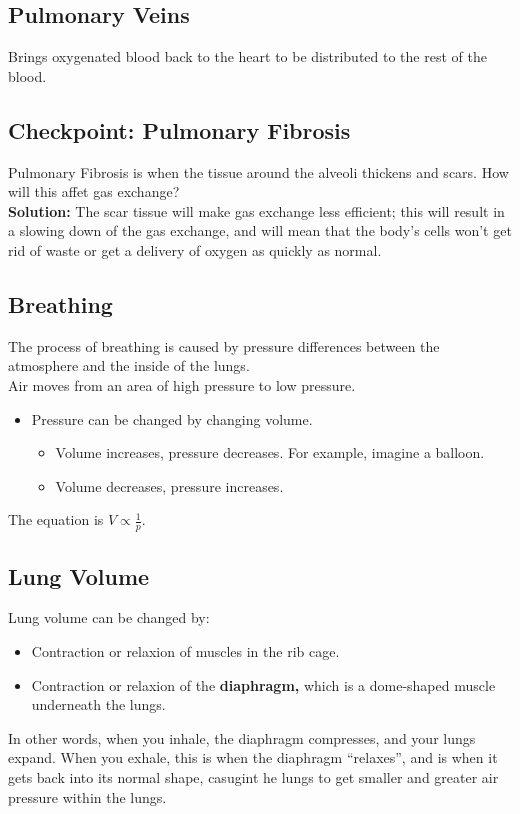 \documentclass[12pt]{report}
\begin{document}
\subsection{Pulmonary Veins}
\begin{definition}
    Brings oxygenated blood back to the heart to be distributed to the rest of the blood.
\end{definition}

\subsection{Checkpoint: Pulmonary Fibrosis}
Pulmonary Fibrosis is when the tissue around the alveoli thickens and scars. How will this affet gas exchange?\\ 

\textbf{Solution:} The scar tissue will make gas exchange less efficient; this will result in a slowing down of the gas exchange, and will mean that the body's cells won't get rid of waste or get a delivery of oxygen as quickly as normal.

\subsection{Breathing}
\begin{definition}[Breathing]
    The process of breathing is caused by pressure differences between the atmosphere and the inside of the lungs.\\ 

    Air moves from an area of high pressure to low pressure.
    \begin{itemize}
        \item{Pressure can be changed by changing volume.}
            \begin{itemize}
                \item{Volume increases, pressure decreases. For example, imagine a balloon.}
                \item{Volume decreases, pressure increases.}
            \end{itemize}
    \end{itemize}
    The equation is $V\propto \frac{1}{p}.$
\end{definition}

\subsection{Lung Volume}
\begin{definition}
    Lung volume can be changed by: 
    \begin{itemize}
        \item{Contraction or relaxion of muscles in the rib cage.}
        \item{Contraction or relaxion of the \textbf{diaphragm,} which is a dome-shaped muscle underneath the lungs.}
    \end{itemize}
    In other words, when you inhale, the diaphragm compresses, and your lungs expand. When you exhale, this is when the diaphragm ``relaxes'', and is when it gets back into its normal shape, casugint he lungs to get smaller and greater air pressure within the lungs.
\end{definition}
\end{document}
